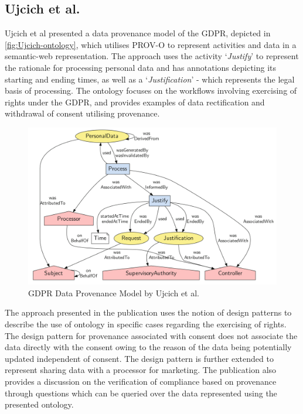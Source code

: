\subsection{Ujcich et al.}\label{sec:sota:gdpr-semweb:ujcich}
Ujcich et al \cite{belhajjame_provenance_2018} presented a data provenance model of the GDPR, depicted in \autoref{fig:Ujcich-ontology}, which utilises PROV-O \cite{lebo_prov-o:_2013} to represent activities and data in a semantic-web representation. The approach uses the activity `\textit{Justify}' to represent the rationale for processing personal data and has annotations depicting its starting and ending times, as well as a `\textit{Justification}' - which represents the legal basis of processing. The ontology focuses on the workflows involving exercising of rights under the GDPR, and provides examples of data rectification and withdrawal of consent utilising provenance.
\begin{figure}[htbp]
    \centering
    \includegraphics[width=\linewidth]{img/Ujcich_ontology.png}
    \caption{GDPR Data Provenance Model by Ujcich et al. \cite{belhajjame_provenance_2018}}
    \label{fig:Ujcich-ontology}
\end{figure}

The approach presented in the publication uses the notion of design patterns to describe the use of ontology in specific cases regarding the exercising of rights. The design pattern for provenance associated with consent does not associate the data directly with the consent owing to the reason of the data being potentially updated independent of consent. The design pattern is further extended to represent sharing data with a processor for marketing. The publication also provides a discussion on the verification of compliance based on provenance through questions which can be queried over the data represented using the presented ontology.

